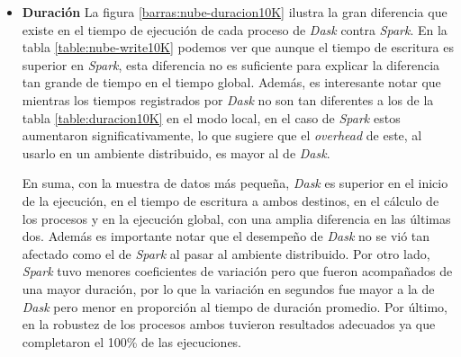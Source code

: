 \begin{itemize}
	\item \textbf{Duración} La figura \ref{barras:nube-duracion10K} ilustra la gran diferencia que existe en el tiempo de ejecución de cada proceso de \textit{Dask} contra \textit{Spark}. En la tabla \ref{table:nube-write10K} podemos ver que aunque el tiempo de escritura es superior en \textit{Spark}, esta diferencia no es suficiente para explicar la diferencia tan grande de tiempo en el tiempo global. Además, es interesante notar que mientras los tiempos registrados por \textit{Dask} no son tan diferentes a los de la tabla \ref{table:duracion10K} en el modo local, en el caso de \textit{Spark} estos aumentaron significativamente, lo que sugiere que el \textit{overhead} de este, al usarlo en un ambiente distribuido, es mayor al de \textit{Dask}.
	
En suma, con la muestra de datos más pequeña, \textit{Dask} es superior en el inicio de la ejecución, en el tiempo de escritura a ambos destinos, en el cálculo de los procesos y en la ejecución global, con una amplia diferencia en las últimas dos. Además es importante notar que el desempeño de \textit{Dask} no se vió tan afectado como el de \textit{Spark} al pasar al ambiente distribuido. Por otro lado, \textit{Spark} tuvo menores coeficientes de variación pero que fueron acompañados de una mayor duración, por lo que la variación en segundos fue mayor a la de \textit{Dask} pero menor en proporción al tiempo de duración promedio. Por último, en la robustez de los procesos ambos tuvieron resultados adecuados ya que completaron el 100\% de las ejecuciones.
	
\end{itemize}


